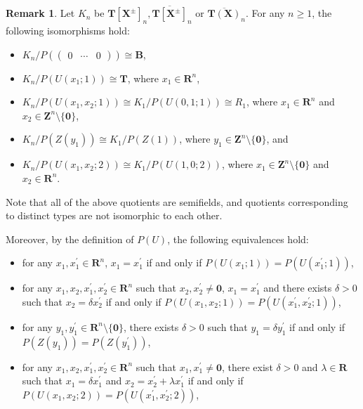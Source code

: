 \documentclass[a4paper,12pt]{amsart}
\theoremstyle{plain}
\theoremstyle{definition}
\newtheorem{remark}[theorem]{Remark}
\begin{document}
\begin{remark}
    \label{rem5}
Let $K_n$ be $\boldsymbol{T}[\boldsymbol{X}^{\pm}]_n, \overline{\boldsymbol{T}[\boldsymbol{X}^{\pm}]}_n$ or $\overline{\boldsymbol{T}(\boldsymbol{X})}_n$.
For any $n \ge 1$, the following isomorphisms hold:
\begin{itemize}
    \item $K_n / P (\begin{pmatrix} 0 & \cdots & 0 \end{pmatrix} ) \cong \boldsymbol{B}$,
    \item $K_n / P (U(x_1;1)) \cong \boldsymbol{T}$, where $x_1 \in \boldsymbol{R}^n$,
    \item $K_n / P (U(x_1,x_2;1)) \cong K_1 / P (U(0,1;1)) \cong R_1$, where $x_1 \in \boldsymbol{R}^n$ and $x_2 \in \boldsymbol{Z}^n \setminus \{ \boldsymbol{0}\}$,
    \item $K_n / P (Z(y_1)) \cong K_1 / P (Z(1))$, where $y_1 \in \boldsymbol{Z}^n \setminus \{ \boldsymbol{0}\}$, and
    \item $K_n / P (U(x_1,x_2;2)) \cong K_1 / P (U(1,0;2))$, where $x_1 \in \boldsymbol{Z}^n \setminus \{ \boldsymbol{0}\}$ and $x_2 \in \boldsymbol{R}^n$.
\end{itemize}
Note that all of the above quotients are semifields, and quotients corresponding to distinct types are not isomorphic to each other.

Moreover, by the definition of $P(U)$, the following equivalences hold:
\begin{itemize}
    \item for any $x_1, x_1^{\prime} \in \boldsymbol{R}^n$, $x_1 = x_1^{\prime}$ if and only if $P (U(x_1;1)) = P (U(x_1^{\prime};1))$,
    \item for any $x_1, x_2, x_1^{\prime}, x_2^{\prime} \in \boldsymbol{R}^n$ such that $x_2, x_2^{\prime} \not= \boldsymbol{0}$, $x_1 = x_1^{\prime}$ and there exists $\delta > 0$ such that $x_2 = \delta x_2^{\prime}$ if and only if $P (U(x_1,x_2;1)) = P (U(x_1^{\prime},x_2^{\prime};1))$,
    \item for any $y_1, y_1^{\prime} \in \boldsymbol{R}^n \setminus \{ \boldsymbol{0} \}$, there exists $\delta > 0$ such that $y_1 = \delta y_1^{\prime}$ if and only if $P (Z(y_1)) = P (Z(y_1^{\prime}))$,
    \item for any $x_1, x_2, x_1^{\prime}, x_2^{\prime} \in \boldsymbol{R}^n$ such that $x_1, x_1^{\prime} \not= \boldsymbol{0}$, there exist $\delta > 0$ and $\lambda \in \boldsymbol{R}$ such that $x_1 = \delta x_1^{\prime}$ and $x_2 = x_2^{\prime} + \lambda x_1^{\prime}$ if and only if $P(U(x_1,x_2;2)) = P(U(x_1^{\prime},x_2^{\prime};2))$,
\end{itemize}
\end{remark}
\end{document}
